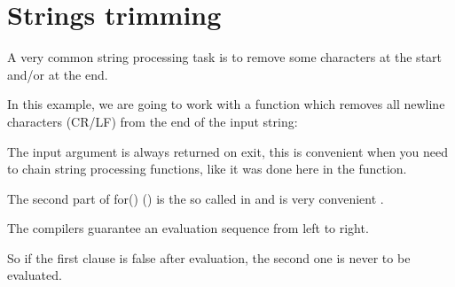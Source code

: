 \section{Strings trimming}
\newcommand{\CRLF}{\ac{CR}/\ac{LF}}

A very common string processing task is to remove some characters at the start and/or at the end.

In this example, we are going to work with a function which removes all newline characters 
(\CRLF{}) from the end of the input string:



The input argument is always returned on exit, this is convenient when you need to chain 
string processing functions, like it was done here in the \main function.

The second part of for() () is the so called  
in \CCpp and is very convenient .

The \CCpp compilers guarantee an evaluation sequence from left to right.

So if the first clause is false after evaluation, the second one is never to be evaluated.






